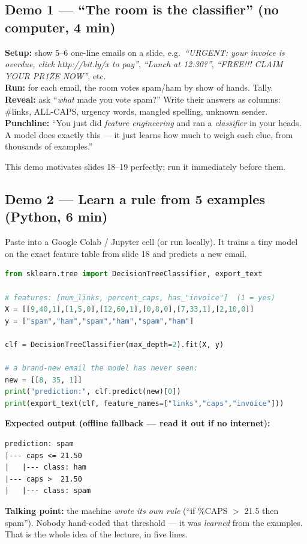 \documentclass[11pt,a4paper]{article}
\begin{document}
\subsection{Demo 1 --- ``The room is the classifier'' (no computer, 4 min)}
\begin{demo}
\textbf{Setup:} show 5--6 one-line emails on a slide, e.g.\
\emph{``URGENT: your invoice is overdue, click http://bit.ly/x to pay''},
\emph{``Lunch at 12:30?''}, \emph{``FREE!!! CLAIM YOUR PR1ZE NOW''}, etc.\\
\textbf{Run:} for each email, the room votes spam/ham by show of hands. Tally.\\
\textbf{Reveal:} ask ``\emph{what} made you vote spam?'' Write their answers as
columns: \#links, ALL-CAPS, urgency words, mangled spelling, unknown sender.\\
\textbf{Punchline:} ``You just did \emph{feature engineering} and ran a
\emph{classifier} in your heads. A model does exactly this --- it just learns how
much to weigh each clue, from thousands of examples.''
\end{demo}
This demo motivates slides 18--19 perfectly; run it immediately before them.

\subsection{Demo 2 --- Learn a rule from 5 examples (Python, 6 min)}
Paste into a Google Colab / Jupyter cell (or run locally). It trains a tiny
model on the exact feature table from slide 18 and predicts a new email.
\begin{lstlisting}[language=Python]
from sklearn.tree import DecisionTreeClassifier, export_text

# features: [num_links, percent_caps, has_"invoice"]  (1 = yes)
X = [[9,40,1],[1,5,0],[12,60,1],[0,8,0],[7,33,1],[2,10,0]]
y = ["spam","ham","spam","ham","spam","ham"]

clf = DecisionTreeClassifier(max_depth=2).fit(X, y)

# a brand-new email the model has never seen:
new = [[8, 35, 1]]
print("prediction:", clf.predict(new)[0])
print(export_text(clf, feature_names=["links","caps","invoice"]))
\end{lstlisting}
\begin{demo}
\textbf{Expected output (offline fallback --- read it out if no internet):}
\begin{lstlisting}
prediction: spam
|--- caps <= 21.50
|   |--- class: ham
|--- caps >  21.50
|   |--- class: spam
\end{lstlisting}
\textbf{Talking point:} the machine \emph{wrote its own rule} (``if \%CAPS $>$
21.5 then spam''). Nobody hand-coded that threshold --- it was \emph{learned} from
the examples. That is the whole idea of the lecture, in five lines.
\end{demo}
\end{document}
